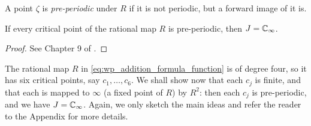 \begin{definition}
    \label{def:preperiodic_point}
    A point $\zeta$ is \emph{pre-periodic} under $R$ if it is not periodic, but
    a forward image of it is.
\end{definition}

\begin{theorem}[$\forall z \in C$, $z$ pre-periodic $\implies J = \ExtC$]
    \label{thm:all_critical_points_preperiodic_implies_J_is_ExtC}
    If every critical point of the rational map $R$ is pre-periodic, then $J =
    \mathbb{C}_\infty$.
\end{theorem}
\begin{proof}
    See Chapter 9 of \cite{Beardon1991}.
\end{proof}

\begin{example*}[Continuation]
    The rational map $R$ in \eqref{eq:wp_addition_formula_function} is of degree
    four, so it has six critical points, say $c_1, \dots, c_6$. We shall show
    now that each $c_j$ is finite, and that each is mapped to $\infty$ (a fixed
    point of $R$) by $R^2$: then each $c_j$ is pre-periodic, and we have $J =
    \mathbb{C}_\infty$. Again, we only sketch the main ideas and refer the reader to the
    Appendix for more details.


\end{example*}
